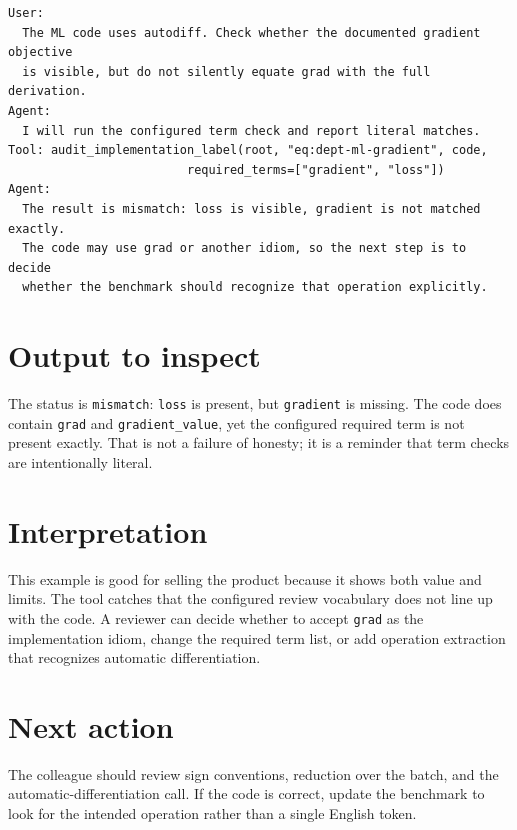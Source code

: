 \documentclass[12pt,a4paper,openany]{book}
\begin{document}
\begin{lstlisting}[basicstyle=\ttfamily\scriptsize]
User:
  The ML code uses autodiff. Check whether the documented gradient objective
  is visible, but do not silently equate grad with the full derivation.
Agent:
  I will run the configured term check and report literal matches.
Tool: audit_implementation_label(root, "eq:dept-ml-gradient", code,
                         required_terms=["gradient", "loss"])
Agent:
  The result is mismatch: loss is visible, gradient is not matched exactly.
  The code may use grad or another idiom, so the next step is to decide
  whether the benchmark should recognize that operation explicitly.
\end{lstlisting}



\section*{Output to inspect}

The status is \texttt{mismatch}: \texttt{loss} is present, but
\texttt{gradient} is missing. The code does contain \texttt{grad} and
\texttt{gradient\_value}, yet the configured required term is not present
exactly. That is not a failure of honesty; it is a reminder that term checks are
intentionally literal.

\section*{Interpretation}

This example is good for selling the product because it shows both value and
limits. The tool catches that the configured review vocabulary does not line up
with the code. A reviewer can decide whether to accept \texttt{grad} as the
implementation idiom, change the required term list, or add operation extraction
that recognizes automatic differentiation.

\section*{Next action}

The colleague should review sign conventions, reduction over the batch, and the
automatic-differentiation call. If the code is correct, update the benchmark to
look for the intended operation rather than a single English token.
\end{document}
